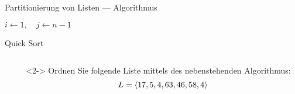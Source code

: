 \begin{frame}{Partitionierung von Listen --- Algorithmus}
\begin{algorithm}[H]
	\caption{Partitionierung}
	\label{sort:alg:partition}
	\DontPrintSemicolon
    $i \gets 1, \quad j \gets n - 1$\;
    \BlankLine
    \;
    \BlankLine
    \;
\end{algorithm}
\end{frame}

\begin{frame}{Quick Sort}
\begin{columns}[T,onlytextwidth]
\begin{column}{0.42\textwidth}
\begin{algorithm}[H]
	\caption{Quick Sort}
	\label{sort:alg:quicksort}
	\DontPrintSemicolon
    \;
\end{algorithm}
\end{column}
\begin{column}{0.53\textwidth}
\begin{task}<2->
Ordnen Sie folgende Liste mittels des nebenstehenden Algorithmus: $$L = \langle17, 5, 4, 63, 46, 58, 4\rangle$$
\end{task}

\end{column}
\end{columns}
\end{frame}


